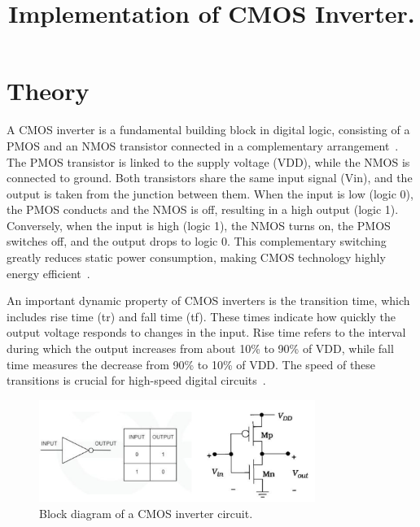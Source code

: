 \documentclass[12pt]{article}
\title{Implementation of CMOS Inverter.}
\author{}
\date{}
\begin{document}


\pagebreak

\tableofcontents

\pagebreak
{}
\maketitle

\section*{Theory}
A CMOS inverter is a fundamental building block in digital logic, consisting of a PMOS and an NMOS transistor connected in a complementary arrangement~\cite{rabaey2003digital}. The PMOS transistor is linked to the supply voltage (VDD), while the NMOS is connected to ground. Both transistors share the same input signal (Vin), and the output is taken from the junction between them. When the input is low (logic 0), the PMOS conducts and the NMOS is off, resulting in a high output (logic 1). Conversely, when the input is high (logic 1), the NMOS turns on, the PMOS switches off, and the output drops to logic 0. This complementary switching greatly reduces static power consumption, making CMOS technology highly energy efficient~\cite{kang2003cmos}.

An important dynamic property of CMOS inverters is the transition time, which includes rise time (tr) and fall time (tf). These times indicate how quickly the output voltage responds to changes in the input. Rise time refers to the interval during which the output increases from about 10\% to 90\% of VDD, while fall time measures the decrease from 90\% to 10\% of VDD. The speed of these transitions is crucial for high-speed digital circuits~\cite{weste2015cmos}.

\begin{figure}[H]
    \centering
    \includegraphics[width=0.8\textwidth]{th.png}
    \caption{Block diagram of a CMOS inverter circuit.\cite{GeeksforGeeks2025Jul}}
\end{figure}
\end{document}
